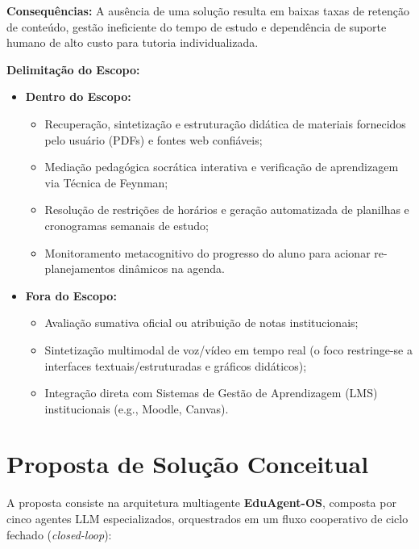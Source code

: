 \documentclass[12pt]{article}
\begin{document}
\textbf{Consequências:}
A ausência de uma solução resulta em baixas taxas de retenção de conteúdo, gestão ineficiente do tempo de estudo e dependência de suporte humano de alto custo para tutoria individualizada.

\textbf{Delimitação do Escopo:}
\begin{itemize}
\item \textbf{Dentro do Escopo:}
\begin{itemize}
\item Recuperação, sintetização e estruturação didática de materiais fornecidos pelo usuário (PDFs) e fontes web confiáveis;
\item Mediação pedagógica socrática interativa e verificação de aprendizagem via Técnica de Feynman;
\item Resolução de restrições de horários e geração automatizada de planilhas e cronogramas semanais de estudo;
\item Monitoramento metacognitivo do progresso do aluno para acionar re-planejamentos dinâmicos na agenda.
\end{itemize}
\item \textbf{Fora do Escopo:}
\begin{itemize}
\item Avaliação sumativa oficial ou atribuição de notas institucionais;
\item Sintetização multimodal de voz/vídeo em tempo real (o foco restringe-se a interfaces textuais/estruturadas e gráficos didáticos);
\item Integração direta com Sistemas de Gestão de Aprendizagem (LMS) institucionais (e.g., Moodle, Canvas).
\end{itemize}
\end{itemize}
\section{Proposta de Solução Conceitual}
\label{sec:solucao}
A proposta consiste na arquitetura multiagente \textbf{EduAgent-OS}, composta por cinco agentes LLM especializados, orquestrados em um fluxo cooperativo de ciclo fechado (\textit{closed-loop}):
\end{document}
